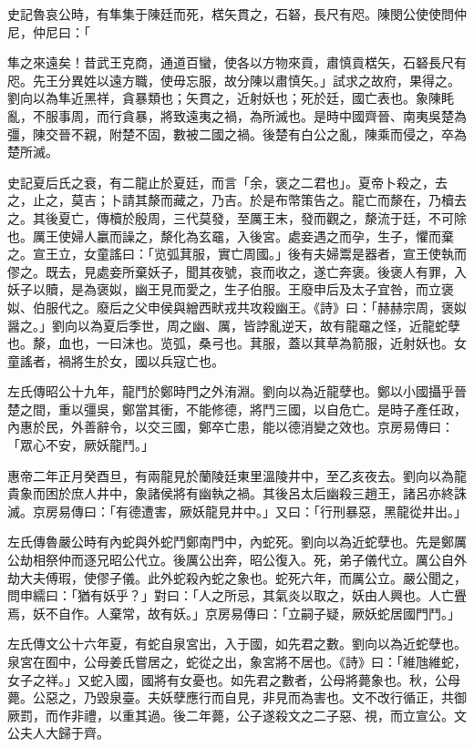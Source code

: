 \begin{pinyinscope}
史記魯哀公時，有隼集于陳廷而死，楛矢貫之，石砮，長尺有咫。陳閔公使使問仲尼，仲尼曰：「

隼之來遠矣！昔武王克商，通道百蠻，使各以方物來貢，肅慎貢楛矢，石砮長尺有咫。先王分異姓以遠方職，使毋忘服，故分陳以肅慎矢。」試求之故府，果得之。劉向以為隼近黑祥，貪暴類也；矢貫之，近射妖也；死於廷，國亡表也。象陳眊亂，不服事周，而行貪暴，將致遠夷之禍，為所滅也。是時中國齊晉、南夷吳楚為彊，陳交晉不親，附楚不固，數被二國之禍。後楚有白公之亂，陳乘而侵之，卒為楚所滅。

史記夏后氏之衰，有二龍止於夏廷，而言「余，褒之二君也」。夏帝卜殺之，去之，止之，莫吉；卜請其漦而藏之，乃吉。於是布幣策告之。龍亡而漦在，乃櫝去之。其後夏亡，傳櫝於殷周，三代莫發，至厲王末，發而觀之，漦流于廷，不可除也。厲王使婦人臝而譟之，漦化為玄黿，入後宮。處妾遇之而孕，生子，懼而棄之。宣王立，女童謠曰：「览弧萁服，實亡周國。」後有夫婦鬻是器者，宣王使執而僇之。既去，見處妾所棄妖子，聞其夜號，哀而收之，遂亡奔褒。後褒人有罪，入妖子以贖，是為褒姒，幽王見而愛之，生子伯服。王廢申后及太子宜咎，而立褒姒、伯服代之。廢后之父申侯與繒西畎戎共攻殺幽王。《詩》曰：「赫赫宗周，褒姒醤之。」劉向以為夏后季世，周之幽、厲，皆誖亂逆天，故有龍黿之怪，近龍蛇孽也。漦，血也，一曰沫也。览弧，桑弓也。萁服，蓋以萁草為箭服，近射妖也。女童謠者，禍將生於女，國以兵寇亡也。

左氏傳昭公十九年，龍鬥於鄭時門之外洧淵。劉向以為近龍孽也。鄭以小國攝乎晉楚之間，重以彊吳，鄭當其衝，不能修德，將鬥三國，以自危亡。是時子產任政，內惠於民，外善辭令，以交三國，鄭卒亡患，能以德消變之效也。京房易傳曰：「眾心不安，厥妖龍鬥。」

惠帝二年正月癸酉旦，有兩龍見於蘭陵廷東里溫陵井中，至乙亥夜去。劉向以為龍貴象而困於庶人井中，象諸侯將有幽執之禍。其後呂太后幽殺三趙王，諸呂亦終誅滅。京房易傳曰：「有德遭害，厥妖龍見井中。」又曰：「行刑暴惡，黑龍從井出。」

左氏傳魯嚴公時有內蛇與外蛇鬥鄭南門中，內蛇死。劉向以為近蛇孽也。先是鄭厲公劫相祭仲而逐兄昭公代立。後厲公出奔，昭公復入。死，弟子儀代立。厲公自外劫大夫傅瑕，使僇子儀。此外蛇殺內蛇之象也。蛇死六年，而厲公立。嚴公聞之，問申繻曰：「猶有妖乎？」對曰：「人之所忌，其氣炎以取之，妖由人興也。人亡舋焉，妖不自作。人棄常，故有妖。」京房易傳曰：「立嗣子疑，厥妖蛇居國門鬥。」

左氏傳文公十六年夏，有蛇自泉宮出，入于國，如先君之數。劉向以為近蛇孽也。泉宮在囿中，公母姜氏嘗居之，蛇從之出，象宮將不居也。《詩》曰：「維虺維蛇，女子之祥。」又蛇入國，國將有女憂也。如先君之數者，公母將薨象也。秋，公母薨。公惡之，乃毀泉臺。夫妖孽應行而自見，非見而為害也。文不改行循正，共御厥罰，而作非禮，以重其過。後二年薨，公子遂殺文之二子惡、視，而立宣公。文公夫人大歸于齊。


\end{pinyinscope}
